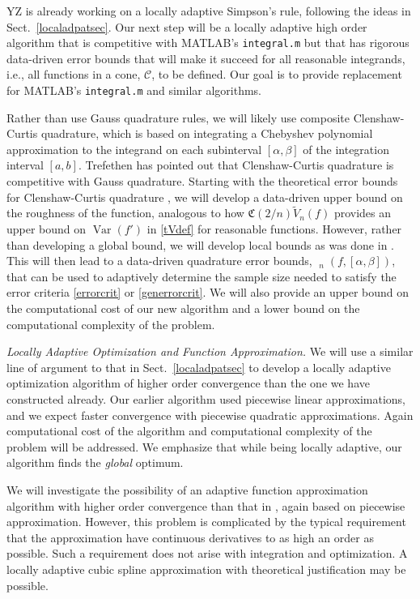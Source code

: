 \documentclass[11pt]{NSFamsart}
\newcommand{\tV}{\widetilde{V}}
\DeclareMathOperator{\err}{err}
\DeclareMathOperator{\herr}{\widehat{\err}}
\DeclareMathOperator{\Var}{Var}
\newcommand{\cc}{\mathcal{C}}
\newcommand{\fC}{\mathfrak{C}}
\begin{document}
YZ is already working on a locally adaptive Simpson's rule, following the ideas in Sect.\ 
\ref{localadpatsec}.  Our next step will be a 
locally adaptive high order algorithm that is competitive with MATLAB's \texttt{integral.m} but that 
has 
rigorous data-driven error bounds that will make it succeed for all reasonable 
integrands, i.e., all functions in a cone, $\cc$, to be defined.  Our goal is to provide replacement for 
MATLAB's \texttt{integral.m} and similar algorithms.  

Rather than use Gauss quadrature rules, we will likely use composite Clenshaw-Curtis quadrature, 
which is based on integrating a Chebyshev polynomial approximation to the integrand on each 
subinterval 
$[\alpha, \beta]$ of the integration interval $[a,b]$.  
Trefethen \cite{Tre08a} has pointed out that Clenshaw-Curtis quadrature is competitive with Gauss 
quadrature.  Starting with the theoretical error bounds for Clenshaw-Curtis quadrature 
\cite{BraPet11a}, we will develop a data-driven upper bound on the roughness of the 
function, 
analogous to how $\fC(2/n)\tV_n(f)$ provides  an upper bound on $\Var(f')$ in \eqref{tVdef} for 
reasonable functions.  However, rather than developing a global bound, we will develop local bounds 
as was done in \cite{ChoEtal17a}.  This will then lead to a data-driven quadrature error bounds, 
$\herr_n(f,[\alpha,\beta])$, that 
can be used to adaptively determine the sample size needed to satisfy the error criteria 
\eqref{errorcrit} or \eqref{generrorcrit}.  We will also provide an upper bound on the computational 
cost of our new algorithm and a lower bound on the computational complexity of the problem.

\emph{Locally Adaptive Optimization and Function Approximation.}
We will use a similar line of argument to that in Sect.\ 
\ref{localadpatsec} to develop a locally adaptive 
optimization algorithm of higher order convergence than the one we have constructed already.  Our 
earlier 
algorithm used piecewise linear approximations, and we expect faster convergence with piecewise 
quadratic approximations.  Again computational cost of the algorithm and computational complexity 
of the problem will be addressed.  We emphasize that while being locally adaptive, our algorithm 
finds the 
\emph{global} optimum.

We will investigate the possibility of an adaptive function approximation algorithm with higher order 
convergence than that  in 
\cite{ChoEtal17a}, again based on piecewise approximation.  However, this problem is complicated 
by the typical requirement that the 
approximation have continuous derivatives to as high an order as possible.  Such a requirement does 
not arise with integration and 
optimization.  A locally adaptive cubic spline approximation with theoretical justification may be 
possible.
\end{document}
